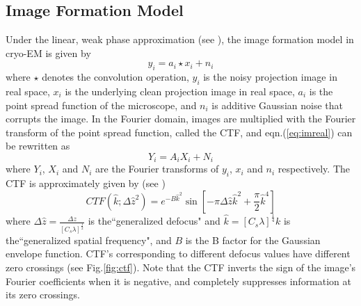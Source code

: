 \documentclass{article}
\begin{document}
\subsection{Image Formation Model}
Under the linear, weak phase approximation (see \cite[Chapter~2]{frankbook}), the image formation model in cryo-EM is given by
\begin{equation}
y_i = a_i\star x_i + n_i
\label{eq:imreal}
\end{equation}
where $\star$ denotes the convolution operation, $y_i$ is the noisy projection image in real space, $x_i$ is the underlying clean projection image in real space, $a_i$ is the point spread function of the microscope, and $n_i$ is additive Gaussian noise that corrupts the image. In the Fourier domain, images are multiplied with the Fourier transform of the point spread function, called the CTF, and eqn.(\ref{eq:imreal}) can be rewritten as
\begin{equation}
Y_i = A_iX_i + N_i
\label{eq:imfour}
\end{equation}
where $Y_i$, $X_i$ and $N_i$ are the Fourier transforms of $y_i$, $x_i$ and $n_i$ respectively.
The CTF is approximately  given by (see  \cite[Chapter~3]{frankbook})
\begin{equation}
CTF(\hat{k};\Delta\hat{z}^2)= e^{-{B\hat{k}}^2}\sin[-\pi \Delta\hat{z}\hat{k}^2 + \frac{\pi}{2} \hat{k}^4]
\label{eq:ctf}
\end{equation}
where 
$\Delta\hat{z}=\frac{\Delta z}{[C_s \lambda]^{\frac{1}{2}}}$ is the``generalized defocus" and $\hat{k}=[C_s \lambda]^{\frac{1}{4}}k$ is the``generalized spatial frequency", and $B$ is the B factor for the Gaussian envelope function. CTF's corresponding to different defocus values have different zero crossings (see Fig.\ref{fig:ctf}). Note that the CTF inverts the sign of the image's Fourier coefficients when it is negative, and completely suppresses information at its zero crossings.
\end{document}

